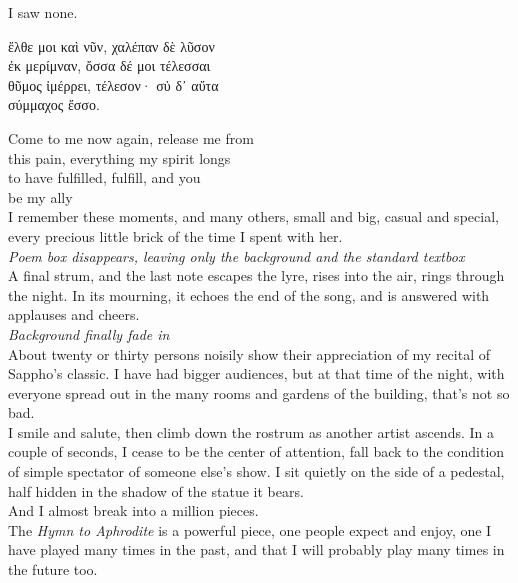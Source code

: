 \documentclass{report}
\newcommand{\dcomment}[1]{
	\emph{#1}
	\\
}
\begin{document}
I saw none.\\

\begin{otherlanguage}{greek}
ἔλθε μοι καὶ νῦν, χαλέπαν δὲ λῦσον\\
ἐκ μερίμναν, ὄσσα δέ μοι τέλεσσαι\\
θῦμος ἰμέρρει, τέλεσον· σὐ δ᾽ αὔτα\\
σύμμαχος ἔσσο.
\end{otherlanguage}

Come to me now again, release me from\\
this pain, everything my spirit longs\\
to have fulfilled, fulfill, and you\\
be my ally
\\

I remember these moments, and many others, small and big, casual and special, every precious little brick of the time I spent with her.\\

\dcomment{
	Poem box disappears, leaving only the background and the standard textbox
}

A final strum, and the last note escapes the lyre, rises into the air, rings through the night. In its mourning, it echoes the end of the song, and is answered with applauses and cheers.\\

\dcomment{
	Background finally fade in
}

About twenty or thirty persons noisily show their appreciation of my recital of Sappho's classic. I have had bigger audiences, but at that time of the night, with everyone spread out in the many rooms and gardens of the building, that's not so bad.\\

I smile and salute, then climb down the rostrum as another artist ascends. In a couple of seconds, I cease to be the center of attention, fall back to the condition of simple spectator of someone else's show. I sit quietly on the side of a pedestal, half hidden in the shadow of the statue it bears.\\

And I almost break into a million pieces.\\

The \emph{Hymn to Aphrodite} is a powerful piece, one people expect and enjoy, one I have played many times in the past, and that I will probably play many times in the future too.
\end{document}
